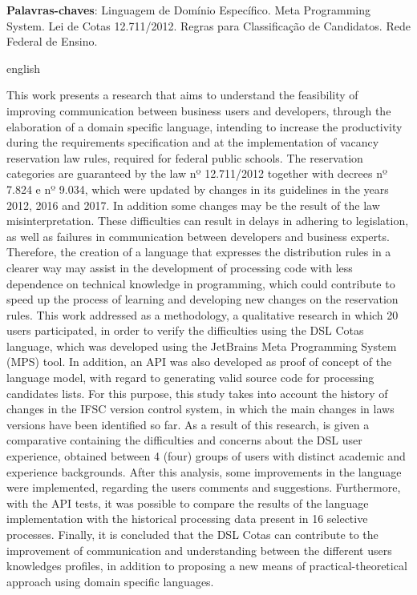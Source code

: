 \begin{resumo}[Resumo]

 \vspace{\onelineskip}
    
 \noindent
 \textbf{Palavras-chaves}: Linguagem de Domínio Específico. Meta Programming System. Lei de Cotas 12.711/2012. Regras para Classificação de Candidatos. Rede Federal de Ensino.
\end{resumo}



\begin{resumo}[Abstract]
\begin{otherlanguage*}{english}

This work presents a research that aims to understand the feasibility of improving communication between business users and developers, through the elaboration of a domain specific language, intending to increase the productivity during the requirements specification and at the implementation of vacancy reservation law rules, required for federal public schools. The reservation categories are guaranteed by the law nº 12.711/2012 together with decrees nº 7.824 e nº 9.034, which were updated by changes in its guidelines in the years 2012, 2016 and 2017. In addition some changes may be the result of the law misinterpretation. These difficulties can result in delays in adhering to legislation, as well as failures in communication between developers and business experts. Therefore, the creation of a language that expresses the distribution rules in a clearer way may assist in the development of processing code with less dependence on technical knowledge in programming, which could contribute to speed up the process of learning and developing new changes on the reservation rules. This work addressed as a methodology, a qualitative research in which 20 users participated, in order to verify the difficulties using the DSL Cotas language, which was developed using the JetBrains Meta Programming System (MPS) tool. In addition, an API was also developed as proof of concept of the language model, with regard to generating valid source code for processing candidates lists. For this purpose, this study takes into account the history of changes in the \gls{IFSC} version control system, in which the main changes in laws versions have been identified so far. As a result of this research, is given a comparative containing the difficulties and concerns about the DSL user experience, obtained between 4 (four) groups of users with distinct academic and experience backgrounds. After this analysis, some improvements in the language were implemented, regarding the users comments and suggestions. Furthermore, with the \gls{API} tests, it was possible to compare the results of the language implementation with the historical processing data present in 16 selective processes. Finally, it is concluded that the DSL Cotas can contribute to the improvement of communication and understanding between the different users knowledges profiles, in addition to proposing a new means of practical-theoretical approach using domain specific languages. 
\end{otherlanguage*}
\end{resumo}
